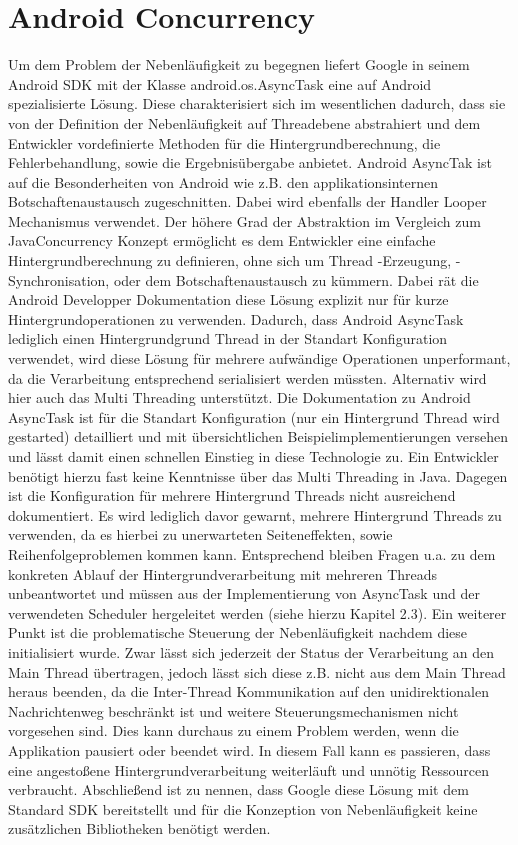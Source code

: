 \documentclass[12pt,oneside,a4paper,bibtotoc,liststotoc]{scrreprt}
\begin{document}
\section{Android Concurrency}
Um dem Problem der Nebenläufigkeit zu begegnen liefert Google in seinem Android SDK mit der Klasse android.os.AsyncTask eine auf Android spezialisierte Lösung. Diese charakterisiert sich im wesentlichen dadurch, dass sie von der Definition der Nebenläufigkeit auf Threadebene abstrahiert und dem Entwickler vordefinierte Methoden für die Hintergrundberechnung, die Fehlerbehandlung, sowie die Ergebnisübergabe anbietet. Android AsyncTak ist auf die Besonderheiten von Android wie z.B. den applikationsinternen Botschaftenaustausch zugeschnitten. Dabei wird ebenfalls der Handler Looper Mechanismus verwendet. Der höhere Grad der Abstraktion im Vergleich zum JavaConcurrency Konzept ermöglicht es dem Entwickler eine einfache Hintergrundberechnung zu definieren, ohne sich um Thread -Erzeugung, -Synchronisation, oder dem Botschaftenaustausch zu kümmern. Dabei rät die Android Developper Dokumentation diese Lösung explizit nur für kurze Hintergrundoperationen zu verwenden. Dadurch, dass Android AsyncTask lediglich einen Hintergrundgrund Thread in der Standart Konfiguration verwendet, wird diese Lösung für mehrere aufwändige Operationen unperformant, da die Verarbeitung entsprechend serialisiert werden müssten. Alternativ wird hier auch das Multi Threading unterstützt. Die Dokumentation zu Android AsyncTask ist für die Standart Konfiguration (nur ein Hintergrund Thread wird gestarted) detailliert und mit übersichtlichen Beispielimplementierungen versehen und lässt damit einen  schnellen Einstieg in diese Technologie zu. Ein Entwickler benötigt hierzu fast keine Kenntnisse über das Multi Threading in Java. Dagegen ist die Konfiguration für mehrere Hintergrund Threads nicht ausreichend dokumentiert. Es wird lediglich davor gewarnt, mehrere Hintergrund Threads zu verwenden, da es hierbei zu unerwarteten Seiteneffekten, sowie Reihenfolgeproblemen kommen kann. Entsprechend bleiben Fragen u.a. zu dem konkreten Ablauf der Hintergrundverarbeitung mit mehreren Threads unbeantwortet und müssen aus der Implementierung von AsyncTask und der verwendeten Scheduler hergeleitet werden (siehe hierzu Kapitel 2.3).\newline
Ein weiterer Punkt ist die problematische Steuerung der Nebenläufigkeit nachdem diese initialisiert wurde. Zwar lässt sich jederzeit der Status der Verarbeitung an den Main Thread übertragen, jedoch lässt sich diese z.B. nicht aus dem Main Thread heraus beenden, da die Inter-Thread Kommunikation auf den unidirektionalen Nachrichtenweg beschränkt ist und weitere Steuerungsmechanismen nicht vorgesehen sind. Dies kann durchaus zu einem Problem werden, wenn die Applikation pausiert oder beendet wird. In diesem Fall kann es passieren, dass eine angestoßene Hintergrundverarbeitung weiterläuft und unnötig Ressourcen verbraucht.\newline
Abschließend ist zu nennen, dass Google diese Lösung mit dem Standard SDK bereitstellt und für die Konzeption von Nebenläufigkeit keine zusätzlichen Bibliotheken benötigt werden.
\end{document}
